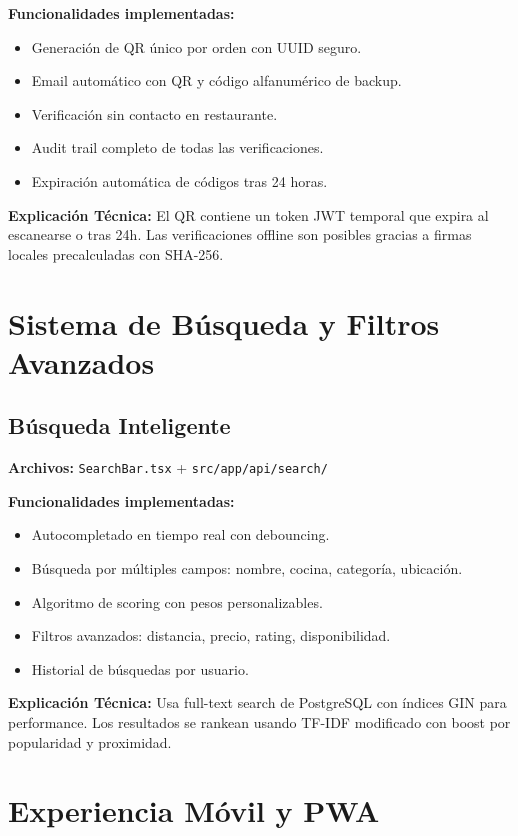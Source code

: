 \documentclass[a4paper,12pt]{article}
\begin{document}
\textbf{Funcionalidades implementadas:}
\begin{itemize}
  \item Generación de QR único por orden con UUID seguro.
  \item Email automático con QR y código alfanumérico de backup.
  \item Verificación sin contacto en restaurante.
  \item Audit trail completo de todas las verificaciones.
  \item Expiración automática de códigos tras 24 horas.
\end{itemize}

\textbf{Explicación Técnica:}  
El QR contiene un token JWT temporal que expira al escanearse o tras 24h. Las verificaciones offline son posibles gracias a firmas locales precalculadas con SHA-256.

\section{Sistema de Búsqueda y Filtros Avanzados}

\subsection{Búsqueda Inteligente}
\textbf{Archivos:} \texttt{SearchBar.tsx} + \texttt{src/app/api/search/}

\textbf{Funcionalidades implementadas:}
\begin{itemize}
  \item Autocompletado en tiempo real con debouncing.
  \item Búsqueda por múltiples campos: nombre, cocina, categoría, ubicación.
  \item Algoritmo de scoring con pesos personalizables.
  \item Filtros avanzados: distancia, precio, rating, disponibilidad.
  \item Historial de búsquedas por usuario.
\end{itemize}

\textbf{Explicación Técnica:}  
Usa full-text search de PostgreSQL con índices GIN para performance. Los resultados se rankean usando TF-IDF modificado con boost por popularidad y proximidad.

\section{Experiencia Móvil y PWA}
\end{document}
